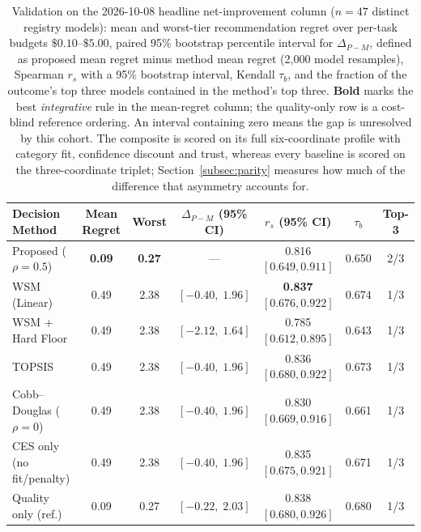 \documentclass[pdflatex,sn-mathphys-num]{sn-jnl}
\theoremstyle{thmstyleone}
\theoremstyle{thmstylethree}
\begin{document}
\begin{table}[!htbp]
\caption{Validation on the 2026-10-08 headline net-improvement column ($n{=}47$ distinct registry models): mean and worst-tier recommendation regret over per-task budgets $\$0.10$--$\$5.00$, paired 95\% bootstrap percentile interval for $\Delta_{P-M}$, defined as proposed mean regret minus method mean regret (2{,}000 model resamples), Spearman $r_s$ with a 95\% bootstrap interval, Kendall $\tau_b$, and the fraction of the outcome's top three models contained in the method's top three. \textbf{Bold} marks the best \emph{integrative} rule in the mean-regret column; the quality-only row is a cost-blind reference ordering. An interval containing zero means the gap is unresolved by this cohort. The composite is scored on its full six-coordinate profile with category fit, confidence discount and trust, whereas every baseline is scored on the three-coordinate triplet; Section~\ref{subsec:parity} measures how much of the difference that asymmetry accounts for.}\label{tab:agent_validation}
\centering
\footnotesize
\setlength{\tabcolsep}{2pt}
\begin{tabular*}{\linewidth}{@{\extracolsep{\fill}}lcccccc@{}}
\toprule
\textbf{Decision Method} & \textbf{Mean Regret} & \textbf{Worst} & \textbf{$\Delta_{P-M}$ (95\% CI)} & \textbf{$r_s$ (95\% CI)} & \textbf{$\tau_b$} & \textbf{Top-3} \\
\midrule
Proposed ($\rho{=}0.5$)    & \textbf{0.09} & \textbf{0.27} & --- & 0.816 $[0.649,0.911]$ & 0.650 & 2/3 \\
WSM (Linear)               & 0.49 & 2.38 & $[-0.40,\;1.96]$ & \textbf{0.837} $[0.676,0.922]$ & 0.674 & 1/3 \\
WSM + Hard Floor           & 0.49 & 2.38 & $[-2.12,\;1.64]$ & 0.785 $[0.612,0.895]$ & 0.643 & 1/3 \\
TOPSIS                     & 0.49 & 2.38 & $[-0.40,\;1.96]$ & 0.836 $[0.680,0.922]$ & 0.673 & 1/3 \\
Cobb--Douglas ($\rho{=}0$) & 0.49 & 2.38 & $[-0.40,\;1.96]$ & 0.830 $[0.669,0.916]$ & 0.661 & 1/3 \\
CES only (no fit/penalty) & 0.49 & 2.38 & $[-0.40,\;1.96]$ & 0.835 $[0.675,0.921]$ & 0.671 & 1/3 \\
\midrule
Quality only (ref.)        & 0.09 & 0.27 & $[-0.22,\;2.03]$ & 0.838 $[0.680,0.926]$ & 0.680 & 1/3 \\
\bottomrule
\end{tabular*}
\end{table}
\end{document}
